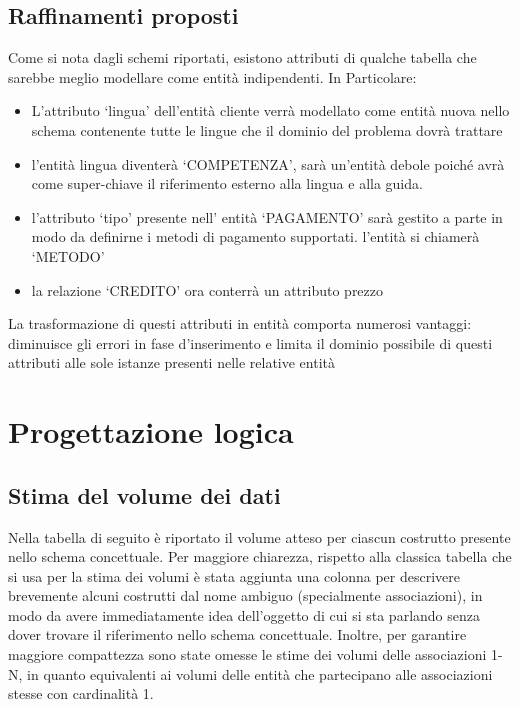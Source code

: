 \documentclass[a4paper,12pt]{report}
\begin{document}
\section{Raffinamenti proposti}
Come si nota dagli schemi riportati, esistono attributi di qualche tabella che sarebbe
meglio modellare come entità indipendenti. In Particolare:
\begin{itemize}
    \item L'attributo `lingua' dell'entità cliente verrà modellato come entità nuova nello schema contenente tutte le lingue che il dominio del problema dovrà trattare
    \item l'entità lingua diventerà `COMPETENZA', sarà un'entità debole poiché avrà come super-chiave il riferimento esterno alla lingua e alla guida.
    \item l'attributo `tipo' presente nell' entità  `PAGAMENTO' sarà gestito a parte in modo da definirne i metodi di pagamento supportati. l'entità si chiamerà `METODO'
    \item la relazione `CREDITO' ora conterrà un attributo prezzo
\end{itemize}
La trasformazione di questi attributi in entità comporta numerosi vantaggi:
diminuisce gli errori in fase d'inserimento e limita il dominio possibile di questi
attributi alle sole istanze presenti nelle relative entità


\newpage
\chapter{Progettazione logica}
\section{Stima del volume dei dati}
Nella tabella di seguito è riportato il volume atteso per ciascun costrutto presente
nello schema concettuale.
Per maggiore chiarezza, rispetto alla classica tabella che si usa per la stima dei
volumi è stata aggiunta una colonna per descrivere brevemente alcuni costrutti dal
nome ambiguo (specialmente associazioni), in modo da avere immediatamente idea
dell’oggetto di cui si sta parlando senza dover trovare il riferimento nello schema
concettuale.
Inoltre, per garantire maggiore compattezza sono state omesse le stime dei volumi
delle associazioni 1-N, in quanto equivalenti ai volumi delle entità che partecipano
alle associazioni stesse con cardinalità 1.
\end{document}

